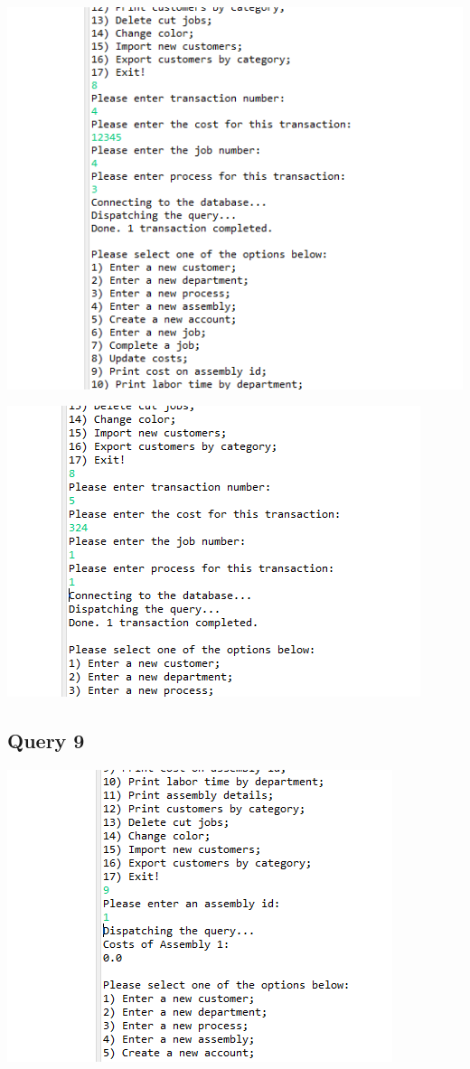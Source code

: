 \documentclass[11pt]{article}
\begin{document}
\includegraphics[width = \textwidth]{tranCost4.png}

\includegraphics[width = \textwidth]{tranCost5.png}
\subsection{Query 9}
\includegraphics[width = \textwidth]{assCost.png}
\end{document}
